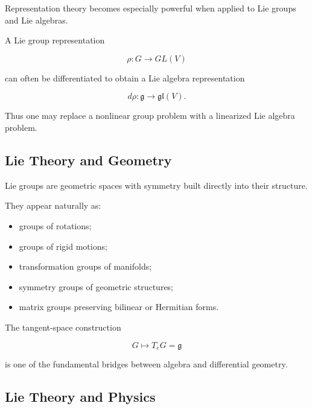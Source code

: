 Representation theory becomes especially powerful when applied to Lie groups
and Lie algebras.

A Lie group representation

\[ \rho:G\to GL(V) \]

can often be differentiated to obtain a Lie algebra representation

\[ d\rho:\mathfrak g\to\mathfrak{gl}(V). \]

Thus one may replace a nonlinear group problem with a linearized Lie algebra
problem.

\begin{center}
\end{center}

\subsection{Lie Theory and Geometry}
\label{subsec:lie-theory-geometry}

Lie groups are geometric spaces with symmetry built directly into their
structure.

They appear naturally as:

\begin{itemize}
    \item groups of rotations;
    \item groups of rigid motions;
    \item transformation groups of manifolds;
    \item symmetry groups of geometric structures;
    \item matrix groups preserving bilinear or Hermitian forms.
\end{itemize}

The tangent-space construction

\[ G\longmapsto T_eG=\mathfrak g \]

is one of the fundamental bridges between algebra and differential geometry.

\subsection{Lie Theory and Physics}
\label{subsec:lie-theory-physics}

